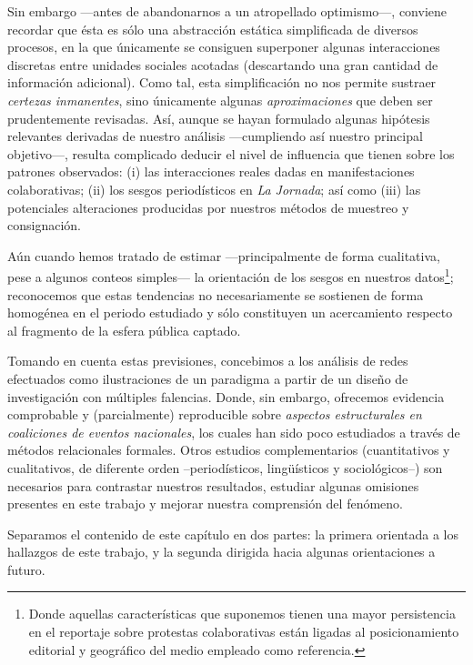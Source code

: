 \documentclass[letterpaper, 11pt]{book}
\theoremstyle{definition}
\theoremstyle{remark}
\begin{document}
Sin embargo ---antes de abandonarnos a un atropellado optimismo---, conviene recordar que ésta es sólo una abstracción estática simplificada de diversos procesos, en la que únicamente se consiguen superponer algunas interacciones discretas entre unidades sociales acotadas (descartando una gran cantidad de información adicional). 
Como tal, esta simplificación no nos permite sustraer \emph{certezas inmanentes}, sino únicamente algunas \emph{aproximaciones} que deben ser prudentemente revisadas. 
Así, aunque se hayan formulado algunas hipótesis relevantes derivadas de nuestro análisis ---cumpliendo así nuestro principal objetivo---, resulta complicado deducir el nivel de influencia que tienen sobre los patrones observados: 
(i) las interacciones reales dadas en manifestaciones colaborativas; 
(ii) los sesgos periodísticos en \emph{La Jornada}; 
así como (iii) las potenciales alteraciones producidas por nuestros métodos de muestreo y consignación. 


Aún cuando hemos tratado de estimar ---principalmente de forma cualitativa, pese a algunos conteos simples--- la orientación de los sesgos en nuestros datos\footnote{
    Donde aquellas características que suponemos tienen una mayor persistencia en el reportaje sobre protestas colaborativas están ligadas al posicionamiento editorial y geográfico del medio empleado como referencia. 
}; 
reconocemos que estas tendencias no necesariamente se sostienen de forma homogénea en el periodo estudiado y sólo constituyen un acercamiento respecto al fragmento de la esfera pública captado. 

Tomando en cuenta estas previsiones, concebimos a los análisis de redes efectuados como ilustraciones de un paradigma a partir de un diseño de investigación con múltiples falencias. 
Donde, sin embargo, ofrecemos evidencia comprobable y (parcialmente) reproducible sobre \emph{aspectos estructurales en coaliciones de eventos nacionales}, los cuales han sido poco estudiados a través de métodos relacionales formales. 
Otros estudios complementarios (cuantitativos y cualitativos, de diferente orden --periodísticos, lingüísticos y sociológicos--) son necesarios para contrastar nuestros resultados, estudiar algunas omisiones presentes en este trabajo y mejorar nuestra comprensión del fenómeno.

Separamos el contenido de este capítulo en dos partes: la primera orientada a los hallazgos de este trabajo, y la segunda dirigida hacia algunas orientaciones a futuro.
\end{document}
